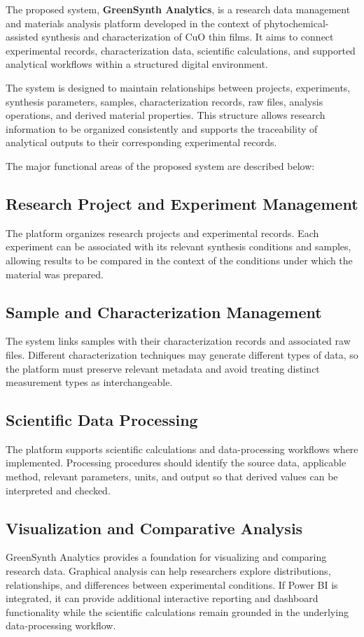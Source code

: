 \documentclass[12pt,a4paper,oneside]{report}
\begin{document}
{{{The proposed system, \textbf{GreenSynth Analytics}, is a research data management and materials analysis platform developed in the context of phytochemical-assisted synthesis and characterization of $\text{CuO}$ thin films. It aims to connect experimental records, characterization data, scientific calculations, and supported analytical workflows within a structured digital environment.

The system is designed to maintain relationships between projects, experiments, synthesis parameters, samples, characterization records, raw files, analysis operations, and derived material properties. This structure allows research information to be organized consistently and supports the traceability of analytical outputs to their corresponding experimental records.

The major functional areas of the proposed system are described below:

\subsection{Research Project and Experiment Management}
The platform organizes research projects and experimental records. Each experiment can be associated with its relevant synthesis conditions and samples, allowing results to be compared in the context of the conditions under which the material was prepared.

\subsection{Sample and Characterization Management}
The system links samples with their characterization records and associated raw files. Different characterization techniques may generate different types of data, so the platform must preserve relevant metadata and avoid treating distinct measurement types as interchangeable.

\subsection{Scientific Data Processing}
The platform supports scientific calculations and data-processing workflows where implemented. Processing procedures should identify the source data, applicable method, relevant parameters, units, and output so that derived values can be interpreted and checked.

\subsection{Visualization and Comparative Analysis}
GreenSynth Analytics provides a foundation for visualizing and comparing research data. Graphical analysis can help researchers explore distributions, relationships, and differences between experimental conditions. If Power BI is integrated, it can provide additional interactive reporting and dashboard functionality while the scientific calculations remain grounded in the underlying data-processing workflow.

}}}
\end{document}
